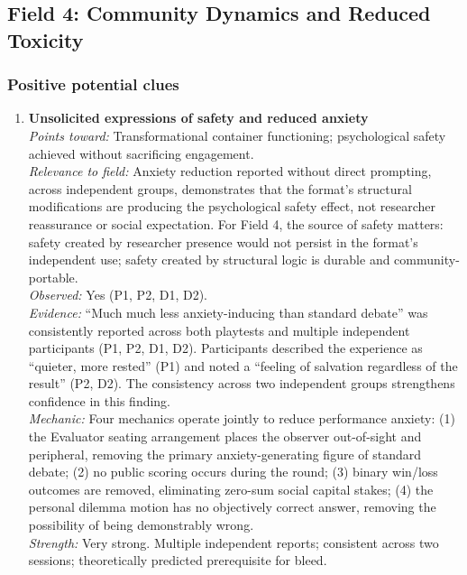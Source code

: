 \bigskip

\subsection*{Field 4: Community Dynamics and Reduced Toxicity}

\subsubsection*{Positive potential clues}

\begin{enumerate}

\item \textbf{Unsolicited expressions of safety and reduced anxiety}\\
\textit{Points toward:} Transformational container functioning; psychological safety achieved without sacrificing engagement.\\
\textit{Relevance to field:} Anxiety reduction reported without direct prompting, across independent groups, demonstrates that the format's structural modifications are producing the psychological safety effect, not researcher reassurance or social expectation. For Field 4, the source of safety matters: safety created by researcher presence would not persist in the format's independent use; safety created by structural logic is durable and community-portable.\\
\textit{Observed:} Yes (P1, P2, D1, D2).\\
\textit{Evidence:} ``Much much less anxiety-inducing than standard debate'' was consistently reported across both playtests and multiple independent participants (P1, P2, D1, D2). Participants described the experience as ``quieter, more rested'' (P1) and noted a ``feeling of salvation regardless of the result'' (P2, D2). The consistency across two independent groups strengthens confidence in this finding.\\
\textit{Mechanic:} Four mechanics operate jointly to reduce performance anxiety: (1) the Evaluator seating arrangement places the observer out-of-sight and peripheral, removing the primary anxiety-generating figure of standard debate; (2) no public scoring occurs during the round; (3) binary win/loss outcomes are removed, eliminating zero-sum social capital stakes; (4) the personal dilemma motion has no objectively correct answer, removing the possibility of being demonstrably wrong.\\
\textit{Strength:} Very strong. Multiple independent reports; consistent across two sessions; theoretically predicted prerequisite for bleed.


\end{enumerate}
